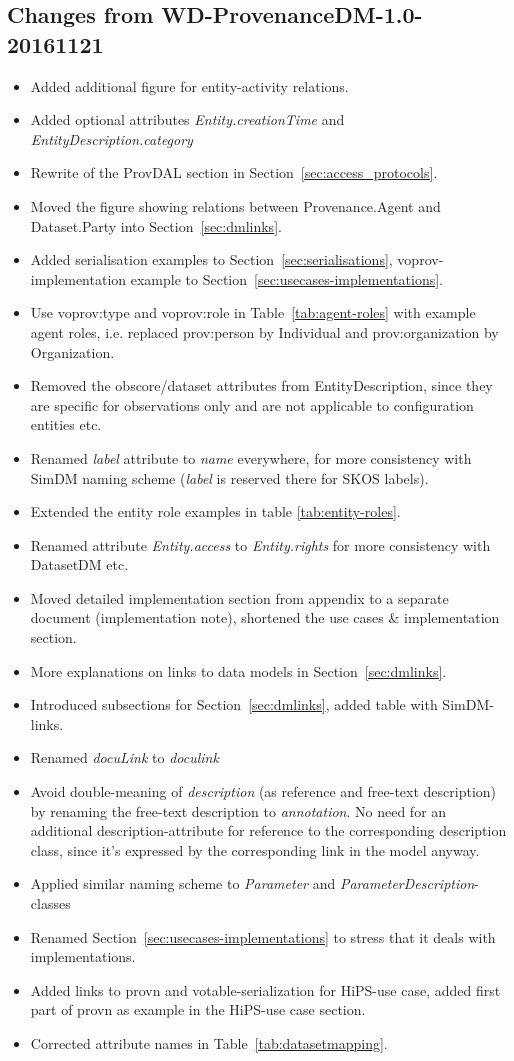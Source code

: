 \documentclass[11pt,a4paper]{ivoa}
\begin{document}
\subsection{Changes from WD-ProvenanceDM-1.0-20161121}
\begin{itemize}
\item Added additional figure for entity-activity relations.
\item Added optional attributes \emph{Entity.creationTime} and \emph{EntityDescription.category}
\item Rewrite of the ProvDAL section in Section~\ref{sec:access_protocols}.
\item Moved the figure showing relations between Provenance.Agent and Dataset.Party into Section~\ref{sec:dmlinks}.
\item Added serialisation examples to Section~\ref{sec:serialisations}, voprov-implementation example to Section~\ref{sec:usecases-implementations}.
\item Use voprov:type and voprov:role in Table~\ref{tab:agent-roles} with example agent roles, i.e. replaced prov:person by Individual and prov:organization by Organization.
\item Removed the obscore/dataset attributes from EntityDescription, since they are specific for observations only and are not applicable to configuration entities etc.
\item Renamed \emph{label} attribute to \emph{name} everywhere, for more consistency with SimDM naming scheme (\emph{label} is reserved there for SKOS labels).
\item Extended the entity role examples in table \ref{tab:entity-roles}.
\item Renamed attribute \emph{Entity.access} to \emph{Entity.rights} for more consistency with DatasetDM etc.
\item Moved detailed implementation section from appendix to a separate document (implementation note), shortened the use cases \& implementation section.
\item More explanations on links to data models in Section~\ref{sec:dmlinks}.
\item Introduced subsections for Section~\ref{sec:dmlinks}, added table with SimDM-links.
\item Renamed \emph{docuLink} to \emph{doculink}
\item Avoid double-meaning of \emph{description} (as reference and free-text description) by renaming the free-text description to \emph{annotation}. No need for an additional description-attribute for reference to the corresponding description class, since it's expressed by the corresponding link in the model anyway.
\item Applied similar naming scheme to \emph{Parameter} and \emph{ParameterDescription}-classes
\item Renamed Section~\ref{sec:usecases-implementations} to stress that it deals with implementations.
\item Added links to provn and votable-serialization for HiPS-use case, added first part of provn as example in the HiPS-use case section.
\item Corrected attribute names in Table~\ref{tab:datasetmapping}.

\end{itemize}





\end{document}
